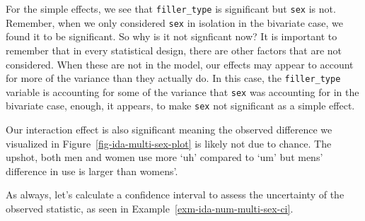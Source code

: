 \documentclass[
  letterpaper,
  DIV=11,
  numbers=noendperiod]{scrreprt}
\theoremstyle{definition}
\theoremstyle{remark}
\begin{document}
For the simple effects, we see that \texttt{filler\_type} is significant
but \texttt{sex} is not. Remember, when we only considered \texttt{sex}
in isolation in the bivariate case, we found it to be significant. So
why is it not signficant now? It is important to remember that in every
statistical design, there are other factors that are not considered.
When these are not in the model, our effects may appear to account for
more of the variance than they actually do. In this case, the
\texttt{filler\_type} variable is accounting for some of the variance
that \texttt{sex} was accounting for in the bivariate case, enough, it
appears, to make \texttt{sex} not significant as a simple effect.

Our interaction effect is also significant meaning the observed
difference we visualized in Figure~\ref{fig-ida-multi-sex-plot} is
likely not due to chance. The upshot, both men and women use more `uh'
compared to `um' but mens' difference in use is larger than womens'.

As always, let's calculate a confidence interval to assess the
uncertainty of the observed statistic, as seen in
Example~\ref{exm-ida-num-multi-sex-ci}.
\end{document}

